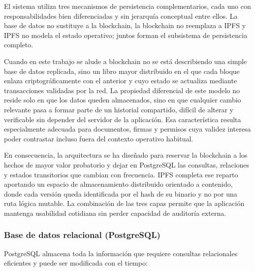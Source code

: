 \documentclass[11pt, a4paper]{article}
\begin{document}
El sistema utiliza tres mecanismos de persistencia complementarios, cada uno con responsabilidades bien diferenciadas y sin jerarquía conceptual entre ellos. La base de datos no sustituye a la blockchain, la blockchain no reemplaza a IPFS y IPFS no modela el estado operativo; juntos forman el subsistema de persistencia completo.

Cuando en este trabajo se alude a blockchain no se está describiendo una simple base de datos replicada, sino un libro mayor distribuido en el que cada bloque enlaza criptográficamente con el anterior y cuyo estado se actualiza mediante transacciones validadas por la red. La propiedad diferencial de este modelo no reside solo en que los datos queden almacenados, sino en que cualquier cambio relevante pasa a formar parte de un historial compartido, difícil de alterar y verificable sin depender del servidor de la aplicación. Esa característica resulta especialmente adecuada para documentos, firmas y permisos cuya validez interesa poder contrastar incluso fuera del contexto operativo habitual.

En consecuencia, la arquitectura se ha diseñado para reservar la blockchain a los hechos de mayor valor probatorio y dejar en PostgreSQL las consultas, relaciones y estados transitorios que cambian con frecuencia. IPFS completa ese reparto aportando un espacio de almacenamiento distribuido orientado a contenido, donde cada versión queda identificada por el hash de su binario y no por una ruta lógica mutable. La combinación de las tres capas permite que la aplicación mantenga usabilidad cotidiana sin perder capacidad de auditoría externa.

\subsubsection{Base de datos relacional (PostgreSQL)}

PostgreSQL almacena toda la información que requiere consultas relacionales eficientes y puede ser modificada con el tiempo:
\end{document}
